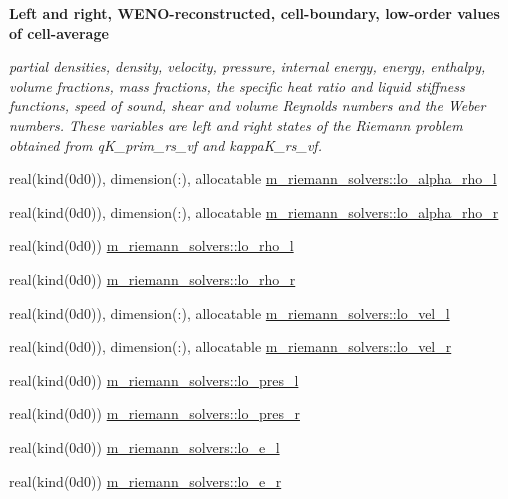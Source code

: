 \begin{Indent}\textbf{ Left and right, W\+E\+N\+O-\/reconstructed, cell-\/boundary, low-\/order values of cell-\/average}\par
{\em partial densities, density, velocity, pressure, internal energy, energy, enthalpy, volume fractions, mass fractions, the specific heat ratio and liquid stiffness functions, speed of sound, shear and volume Reynolds numbers and the Weber numbers. These variables are left and right states of the Riemann problem obtained from q\+K\+\_\+prim\+\_\+rs\+\_\+vf and kappa\+K\+\_\+rs\+\_\+vf. }\begin{DoxyCompactItemize}
\item 
real(kind(0d0)), dimension(\+:), allocatable \hyperlink{namespacem__riemann__solvers_ad1c29f933978f01c9402ad5287abdfe6}{m\+\_\+riemann\+\_\+solvers\+::lo\+\_\+alpha\+\_\+rho\+\_\+l}
\item 
real(kind(0d0)), dimension(\+:), allocatable \hyperlink{namespacem__riemann__solvers_a3874a511fdd71a444bfcc9193103e148}{m\+\_\+riemann\+\_\+solvers\+::lo\+\_\+alpha\+\_\+rho\+\_\+r}
\item 
real(kind(0d0)) \hyperlink{namespacem__riemann__solvers_ac99e69e03846f742aa0ce5e228d5167f}{m\+\_\+riemann\+\_\+solvers\+::lo\+\_\+rho\+\_\+l}
\item 
real(kind(0d0)) \hyperlink{namespacem__riemann__solvers_a81537cffcfd4fb575ffaffdc1ed64028}{m\+\_\+riemann\+\_\+solvers\+::lo\+\_\+rho\+\_\+r}
\item 
real(kind(0d0)), dimension(\+:), allocatable \hyperlink{namespacem__riemann__solvers_ae939a1e2f36044a0729480d09e05d74f}{m\+\_\+riemann\+\_\+solvers\+::lo\+\_\+vel\+\_\+l}
\item 
real(kind(0d0)), dimension(\+:), allocatable \hyperlink{namespacem__riemann__solvers_acf54d997ef4105fd507c180db700c873}{m\+\_\+riemann\+\_\+solvers\+::lo\+\_\+vel\+\_\+r}
\item 
real(kind(0d0)) \hyperlink{namespacem__riemann__solvers_ab0807a312841bf144ff78338bf11a89b}{m\+\_\+riemann\+\_\+solvers\+::lo\+\_\+pres\+\_\+l}
\item 
real(kind(0d0)) \hyperlink{namespacem__riemann__solvers_a8ac4fca37ee46e90e61ca83a1e4eb2c5}{m\+\_\+riemann\+\_\+solvers\+::lo\+\_\+pres\+\_\+r}
\item 
real(kind(0d0)) \hyperlink{namespacem__riemann__solvers_abf27be79fc84bb7830520e08774fd56c}{m\+\_\+riemann\+\_\+solvers\+::lo\+\_\+e\+\_\+l}
\item 
real(kind(0d0)) \hyperlink{namespacem__riemann__solvers_a7596585d3504d397f16723b6a6ffd862}{m\+\_\+riemann\+\_\+solvers\+::lo\+\_\+e\+\_\+r}

\end{DoxyCompactItemize}
\end{Indent}
